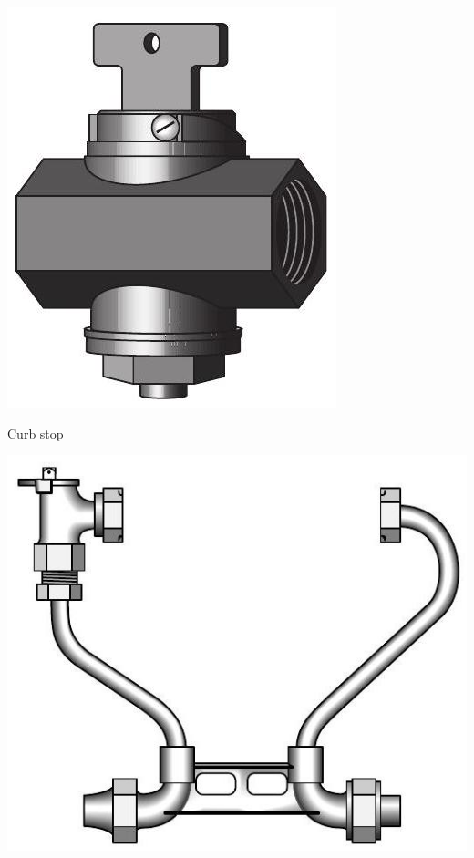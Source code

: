\documentclass[10pt]{article}
\begin{document}
\includegraphics[max width=\textwidth]{CurbStop}

Curb stop

\includegraphics[max width=\textwidth]{MeterSetter}
\end{document}
